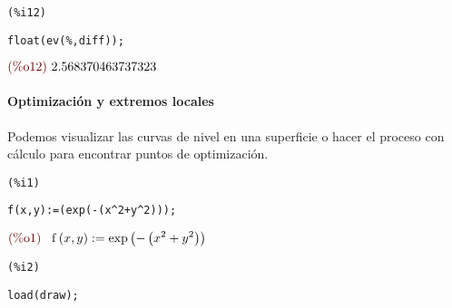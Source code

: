 \documentclass[12pt]{article}
\begin{document}
\noindent
\begin{minipage}[t]{8ex}{\color{red}\bf
\begin{verbatim}
(%i12) 
\end{verbatim}}
\end{minipage}
\begin{minipage}[t]{\textwidth}{\color{blue}
\begin{verbatim}
float(ev(%,diff));
\end{verbatim}}
\end{minipage}
\begin{math}\displaystyle
\parbox{8ex}{\color{labelcolor}(\%o12) }
2.568370463737323
\end{math}

\paragraph{Optimización y extremos locales} Podemos visualizar las curvas de nivel en una superficie o hacer el proceso con cálculo para encontrar puntos de optimización.

\noindent
\begin{minipage}[t]{8ex}{\color{red}\bf
\begin{verbatim}
(%i1) 
\end{verbatim}}
\end{minipage}
\begin{minipage}[t]{\textwidth}{\color{blue}
\begin{verbatim}
f(x,y):=(exp(-(x^2+y^2)));
\end{verbatim}}
\end{minipage}
\begin{math}\displaystyle
\parbox{8ex}{\color{labelcolor}(\%o1) }
\mathrm{f}\left( x,y\right) :=\mathrm{exp}\left( -\left( {x}^{2}+{y}^{2}\right) \right) 
\end{math}


\noindent
\begin{minipage}[t]{8ex}{\color{red}\bf
\begin{verbatim}
(%i2) 
\end{verbatim}}
\end{minipage}
\begin{minipage}[t]{\textwidth}{\color{blue}
\begin{verbatim}
load(draw);
\end{verbatim}}
\end{minipage}
\end{document}
